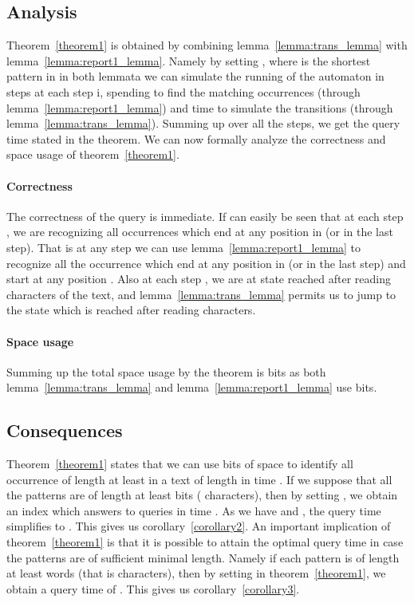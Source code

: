 \documentclass{article}
\newcommand{\?}{\mskip1.5mu}
\begin{document}
\subsection{Analysis}
Theorem~\ref{theorem1} is obtained by combining lemma~\ref{lemma:trans_lemma} with lemma~\ref{lemma:report1_lemma}. Namely by setting , where  is the shortest pattern in  in both lemmata we can simulate the running of the automaton in  steps at each step i, spending  to find the  matching occurrences (through lemma~\ref{lemma:report1_lemma}) and  time to simulate the transitions (through lemma~\ref{lemma:trans_lemma}). Summing up over all the  steps, we get the query time stated in the theorem.
We can now formally analyze the correctness and space usage of theorem~\ref{theorem1}.  
\paragraph{Correctness}
The correctness of the query is immediate. If can easily be seen that at each step , we are recognizing all occurrences which end at any position in  (or  in the last step). That is at any step  we can use lemma~\ref{lemma:report1_lemma} to recognize all the occurrence which end at any position in  (or  in the last step) and start at any position . Also at each step , we are at state  reached after reading  characters of the text, and lemma~\ref{lemma:trans_lemma} permits us to jump to the state  which is reached after reading  characters.
\paragraph{Space usage}
Summing up the total space usage by the theorem is  bits as both lemma~\ref{lemma:trans_lemma} and lemma~\ref{lemma:report1_lemma} use  bits. 


\subsection{Consequences}
Theorem~\ref{theorem1} states that we can use  bits of space to identify all occurrence of length at least  in a text  of length  in time . If we suppose that all the patterns are of length at least  bits ( characters), then by setting , we obtain an index which answers to queries in time . As we have  and , the query time simplifies to  . This gives us corollary~\ref{corollary2}. 
An important implication of theorem~\ref{theorem1} is that it is possible to attain the optimal  query time in case the patterns are of sufficient minimal length. Namely if each pattern is of length at least  words (that is  characters), then by setting  in theorem~\ref{theorem1}, we obtain a query time of .  This gives us corollary~\ref{corollary3}.  
\end{document}
